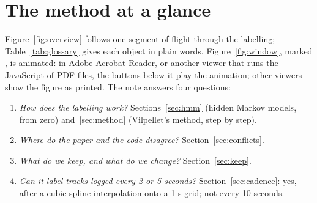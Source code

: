 \section*{The method at a glance}

Figure~\ref{fig:overview} follows one segment of flight through the labelling;
Table~\ref{tab:glossary} gives each object in plain words. Figure~\ref{fig:window}, marked
\animmark, is animated: in Adobe Acrobat Reader, or another viewer that runs the JavaScript of PDF
files, the buttons below it play the animation; other viewers show the figure as printed. The note
answers four questions:
\begin{enumerate}[label=\arabic*.]
  \item \emph{How does the labelling work?} Sections~\ref{sec:hmm} (hidden Markov models, from
        zero) and~\ref{sec:method} (Vilpellet's method, step by step).
  \item \emph{Where do the paper and the code disagree?} Section~\ref{sec:conflicts}.
  \item \emph{What do we keep, and what do we change?} Section~\ref{sec:keep}.
  \item \emph{Can it label tracks logged every 2 or 5 seconds?} Section~\ref{sec:cadence}: yes, after
        a cubic-spline interpolation onto a 1-s grid; not every 10 seconds.
\end{enumerate}

